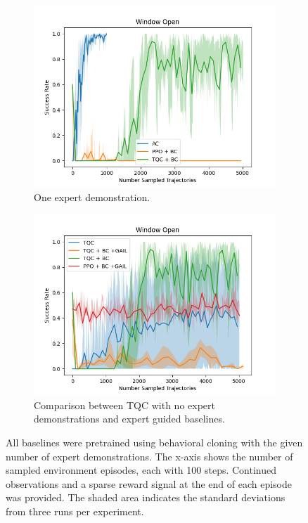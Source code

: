 \begin{figure}[htbp]
\begin{subfigure}[t]{0.45\textwidth}
    \includegraphics[width=\textwidth]{images/dense_1/Window Open.png}
    \caption{One expert demonstration.}
  \end{subfigure}
  \hfill
  \begin{subfigure}[t]{0.45\textwidth}
    \includegraphics[width=\textwidth]{images/TQC_bc_GAIL_vs_ref/Window Open.png}
    \caption{Comparison between TQC with no expert demonstrations and expert guided baselines.}
    \label{fig:TQC_0_vs_exp}
  \end{subfigure}
  \caption{All baselines were pretrained using behavioral cloning with the given number of expert demonstrations. 
    The x-axis shows the number of sampled environment episodes, each with 100 steps. 
    Continued observations and a sparse reward signal at the end of each episode was provided. 
    The shaded area indicates the standard deviations from three runs per experiment.}
    \label{fig:dense_ref}
\end{figure}

